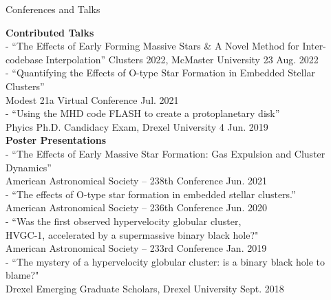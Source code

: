 \documentclass{resume} %
\newcommand{\forceindent}{\leavevmode{\parindent=1em\indent}}
\begin{document}
\begin{rSection}{Conferences and Talks}

\textbf{Contributed Talks}\\
- ``The Effects of Early Forming Massive Stars \& A Novel Method for Inter-codebase Interpolation''
\forceindent Clusters 2022, McMaster University \hfill 23 Aug. 2022\\
- ``Quantifying the Effects of O-type Star Formation in Embedded Stellar Clusters''\\
\forceindent Modest 21a Virtual Conference \hfill Jul. 2021\\
- ``Using the MHD code FLASH to create a protoplanetary disk''\\
\forceindent Phyics Ph.D. Candidacy Exam, Drexel University \hfill 4 Jun. 2019\\

\textbf{Poster Presentations}\\
- ``The Effects of Early Massive Star Formation: Gas Expulsion and Cluster Dynamics''\\
\forceindent American Astronomical Society -- 238th Conference \hfill Jun. 2021\\
- ``The effects of O-type star formation in embedded stellar clusters.''\\
\forceindent American Astronomical Society -- 236th Conference \hfill Jun. 2020\\
- ``Was the first observed hypervelocity globular cluster, \\ \forceindent HVGC-1, accelerated by a supermassive binary black hole?"\\
\forceindent American Astronomical Society -- 233rd Conference \hfill Jan. 2019\\
- ``The mystery of a hypervelocity globular cluster: is a binary black hole to blame?"\\
\forceindent Drexel Emerging Graduate Scholars, Drexel University \hfill Sept. 2018\\

\end{rSection}

\end{document}
